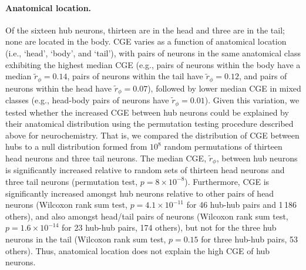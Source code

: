 \documentclass[10pt,letterpaper]{article}
\begin{document}
{\paragraph{Anatomical location.}
Of the sixteen hub neurons, thirteen are in the head and three are in the tail; none are located in the body.
CGE varies as a function of anatomical location (i.e., `head', `body', and `tail'), with pairs of neurons in the same anatomical class exhibiting the highest median CGE (e.g., pairs of neurons within the body have a median $\tilde{r}_\phi = 0.14$, pairs of neurons within the tail have $\tilde{r}_\phi = 0.12$, and pairs of neurons within the head have $\tilde{r}_\phi = 0.07$), followed by lower median CGE in mixed classes (e.g., head-body pairs of neurons have $\tilde{r}_\phi = 0.01$).
Given this variation, we tested whether the increased CGE between hub neurons could be explained by their anatomical distribution using the permutation testing procedure described above for neurochemistry.
That is, we compared the distribution of CGE between hubs to a null distribution formed from $10^8$ random permutations of thirteen head neurons and three tail neurons.
The median CGE, $\tilde{r}_\phi$, between hub neurons is significantly increased relative to random sets of thirteen head neurons and three tail neurons (permutation test, $p = 8\times10^{-8}$).
Furthermore, CGE is significantly increased amongst hub neurons relative to other pairs of head neurons (Wilcoxon rank sum test, $p = 4.1 \times 10^{-11}$ for 46 hub-hub pairs and 1\,186 others),
and also amongst head/tail pairs of neurons (Wilcoxon rank sum test, $p = 1.6 \times 10^{-14}$ for 23 hub-hub pairs, 174 others),
but not for the three hub neurons in the tail (Wilcoxon rank sum test, $p = 0.15$ for three hub-hub pairs, 53 others).
Thus, anatomical location does not explain the high CGE of hub neurons.

}
\end{document}

